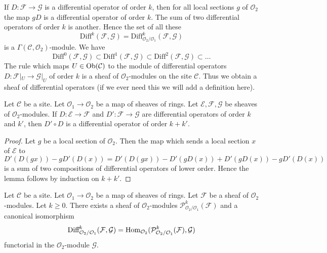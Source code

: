 \noindent
If $D : \mathcal{F} \to \mathcal{G}$ is a differential operator of order $k$,
then for all local sections $g$ of $\mathcal{O}_2$ the map $gD$ is a
differential operator of order $k$. The sum of two differential operators of
order $k$ is another. Hence the set of all these
$$
\text{Diff}^k(\mathcal{F}, \mathcal{G}) =
\text{Diff}^k_{\mathcal{O}_2/\mathcal{O}_1}(\mathcal{F}, \mathcal{G})
$$
is a $\Gamma(\mathcal{C}, \mathcal{O}_2)$-module. We have
$$
\text{Diff}^0(\mathcal{F}, \mathcal{G}) \subset
\text{Diff}^1(\mathcal{F}, \mathcal{G}) \subset
\text{Diff}^2(\mathcal{F}, \mathcal{G}) \subset \ldots
$$
The rule which maps $U \in \mathop{\mathrm{Ob}}\nolimits(\mathcal{C})$ to the module of
differential operators $D : \mathcal{F}|_U \to \mathcal{G}|_U$
of order $k$ is a sheaf of $\mathcal{O}_2$-modules on the site $\mathcal{C}$.
Thus we obtain a sheaf of differential operators (if we ever need this we will
add a definition here).

\begin{lemma}
\label{lemma-composition-differential-operators}
Let $\mathcal{C}$ be a site.
Let $\mathcal{O}_1 \to \mathcal{O}_2$ be a map of sheaves of rings.
Let $\mathcal{E}, \mathcal{F}, \mathcal{G}$ be sheaves of
$\mathcal{O}_2$-modules.
If $D : \mathcal{E} \to \mathcal{F}$ and $D' : \mathcal{F} \to \mathcal{G}$
are differential operators of order $k$ and $k'$, then $D' \circ D$ is a
differential operator of order $k + k'$.
\end{lemma}

\begin{proof}
Let $g$ be a local section of $\mathcal{O}_2$.
Then the map which sends a local section $x$ of $\mathcal{E}$ to
$$
D'(D(gx)) - gD'(D(x)) = D'(D(gx)) - D'(gD(x)) + D'(gD(x)) - gD'(D(x))
$$
is a sum of two compositions of differential operators of lower order.
Hence the lemma follows by induction on $k + k'$.
\end{proof}

\begin{lemma}
\label{lemma-module-principal-parts}
Let $\mathcal{C}$ be a site.
Let $\mathcal{O}_1 \to \mathcal{O}_2$ be a map of sheaves of rings.
Let $\mathcal{F}$ be a sheaf of $\mathcal{O}_2$-modules.
Let $k \geq 0$. There exists a sheaf of $\mathcal{O}_2$-modules
$\mathcal{P}^k_{\mathcal{O}_2/\mathcal{O}_1}(\mathcal{F})$
and a canonical isomorphism
$$
\text{Diff}^k_{\mathcal{O}_2/\mathcal{O}_1}(\mathcal{F}, \mathcal{G}) =
\mathop{\mathrm{Hom}}\nolimits_{\mathcal{O}_2}(
\mathcal{P}^k_{\mathcal{O}_2/\mathcal{O}_1}(\mathcal{F}), \mathcal{G})
$$
functorial in the $\mathcal{O}_2$-module $\mathcal{G}$.
\end{lemma}

